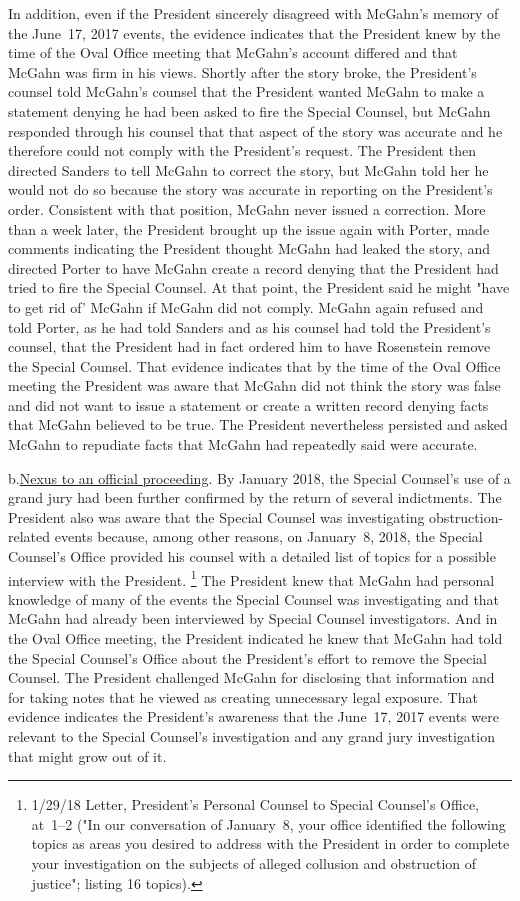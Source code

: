 In addition, even if the President sincerely disagreed with McGahn's memory of the June~17, 2017 events, the evidence indicates that the President knew by the time of the Oval Office
meeting that McGahn's account differed and that McGahn was firm in his views.
Shortly after the story broke, the President's counsel told McGahn's counsel that the President wanted McGahn to make a statement denying he had been asked to fire the Special Counsel, but McGahn responded through his counsel that that aspect of the story was accurate and he therefore could not comply with the President's request.
The President then directed Sanders to tell McGahn to correct the story, but McGahn told her he would not do so because the story was accurate in reporting on the President's order.
Consistent with that position, McGahn never issued a correction.
More than a week later, the President brought up the issue again with Porter, made comments indicating the President thought McGahn had leaked the story, and directed Porter to have McGahn create a record denying that the President had tried to fire the Special Counsel.
At that point, the President said he might "have to get rid of' McGahn if McGahn did not comply.
McGahn again refused and told Porter, as he had told Sanders and as his counsel had told the President's counsel, that the President had in fact ordered him to have Rosenstein remove the Special Counsel.
That evidence indicates that by the time of the Oval Office meeting the President was aware that McGahn did not think the story was false and did not want to issue a statement or create a written record denying facts that McGahn believed to be true.
The President nevertheless persisted and asked McGahn to repudiate facts that McGahn had repeatedly said were accurate.

b.\qquad\underline{Nexus to an official proceeding}.
By January 2018, the Special Counsel's use of a grand jury had been further confirmed by the return of several indictments.
The President also was aware that the Special Counsel was investigating obstruction-related events because, among other reasons, on January~8, 2018, the Special Counsel's Office provided his counsel with a detailed list of topics for a possible interview with the President.%
\footnote{1/29/18 Letter, President's Personal Counsel to Special Counsel's Office, at~1--2 ("In our conversation of January~8, your office identified the following topics as areas you desired to address with the President in order to complete your investigation on the subjects of alleged collusion and obstruction of justice";
listing 16 topics).}
The President knew that McGahn had personal knowledge of many of the events the Special Counsel was investigating and that McGahn had already been interviewed by Special Counsel investigators.
And in the Oval Office meeting, the President indicated he knew that McGahn had told the Special Counsel's Office about the President's effort to remove the Special Counsel.
The President challenged McGahn for disclosing that information and for taking notes that he viewed as creating unnecessary legal exposure.
That evidence indicates the President's awareness that the June~17, 2017 events were relevant to the Special Counsel's investigation and any grand jury investigation that might grow out of it.

